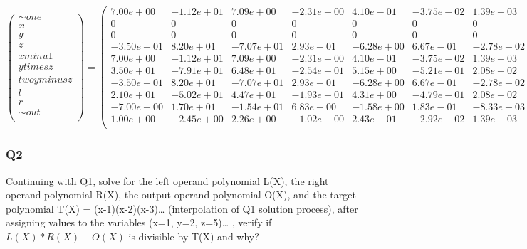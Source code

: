\documentclass[11pt]{article}
\begin{document}
\(\begin{pmatrix} \sim{one} \\ x \\ y \\ z \\ xminu1 \\ ytimesz \\ twoyminusz \\ l \\ r \\ \sim{out} \\ \end{pmatrix} = \begin{pmatrix} 7.00e+00& -1.12e+01& 7.09e+00& -2.31e+00& 4.10e-01& -3.75e-02& 1.39e-03 \\ 0&0&0&0&0&0&0 \\ 0&0&0&0&0&0&0 \\ -3.50e+01& 8.20e+01& -7.07e+01& 2.93e+01& -6.28e+00& 6.67e-01& -2.78e-02 \\ 7.00e+00& -1.12e+01& 7.09e+00& -2.31e+00& 4.10e-01& -3.75e-02& 1.39e-03 \\ 3.50e+01& -7.91e+01& 6.48e+01& -2.54e+01& 5.15e+00& -5.21e-01& 2.08e-02 \\ -3.50e+01& 8.20e+01& -7.07e+01& 2.93e+01& -6.28e+00& 6.67e-01& -2.78e-02 \\ 2.10e+01& -5.02e+01& 4.47e+01& -1.93e+01& 4.31e+00& -4.79e-01& 2.08e-02 \\ -7.00e+00& 1.70e+01& -1.54e+01& 6.83e+00& -1.58e+00& 1.83e-01& -8.33e-03 \\ 1.00e+00& -2.45e+00& 2.26e+00& -1.02e+00& 2.43e-01& -2.92e-02& 1.39e-03 \\ \end{pmatrix} \cdot \begin{pmatrix} 1 \\ x \\ x^2 \\ x^3 \\ x^4 \\ x5 \\ x6 \end{pmatrix}\)

\subsubsection{Q2}
\label{q2}
Continuing with Q1, solve for the left operand polynomial L(X), the right operand polynomial R(X), the output operand polynomial O(X), and the target polynomial T(X) = (x-1)(x-2)(x-3)\ldots{} (interpolation of Q1 solution process), after assigning values to the variables (x=1, y=2, z=5)\ldots{} , verify if \(L(X)*R(X) - O(X)\) is divisible by T(X) and why?
\end{document}
